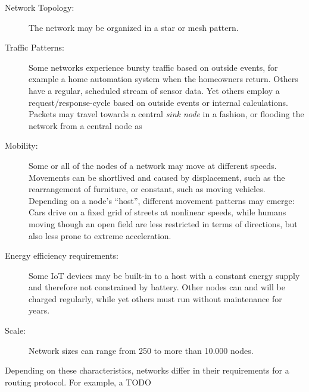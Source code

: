 \documentclass{acm_proc_article-sp}
\begin{document}
\begin{description}
\item[Network Topology:] The network may be organized in a star or mesh pattern.
\item[Traffic Patterns:] Some networks experience bursty traffic based on outside events, for example a home automation system when the homeowners return. Others have a regular, scheduled stream of sensor data. Yet others employ a request/response-cycle based on outside events or internal calculations. Packets may travel towards a central \emph{sink node} in a %
 fashion, or flooding the network from a central node as %
\item[Mobility:] Some or all of the nodes of a network may move at different speeds. Movements can be shortlived and caused by displacement, such as the rearrangement of furniture, or constant, such as moving vehicles. Depending on a node's ``host'', different movement patterns may emerge: Cars drive on a fixed grid of streets at nonlinear speeds, while humans moving though an open field are less restricted in terms of directions, but also less prone to extreme acceleration.
\item[Energy efficiency requirements:] Some IoT devices may be built-in to a host with a constant energy supply and therefore not constrained by battery. Other nodes can and will be charged regularly, while yet others must run without maintenance for years.
\item[Scale:] Network sizes can range from 250 to more than 10.000 nodes.
\end{description}

Depending on these characteristics, networks differ in their requirements for a routing protocol. For example, a TODO
\end{document}
